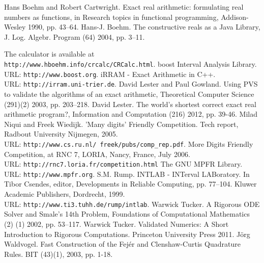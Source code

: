 \documentclass[9pt, a4, twocolumn]{article}
\begin{document}
\begin{thebibliography}{99}
 Hans Boehm and Robert Cartwright. Exact real
  arithmetic: formulating real numbers as functions, in Research
  topics in functional programming,
Addison-Wesley 1990, pp. 43--64.
 Hans-J. Boehm. The constructive reals as a Java
  Library, J. Log. Algebr. Program (64) 2004, pp. 3--11.

The calculator is available at \\ \texttt{http://www.hboehm.info/crcalc/CRCalc.html}.
 boost Interval Analysis Library.
\\ URL:
  \texttt{http://www.boost.org}.
 iRRAM - Exact Arithmetic in C++. \\ URL: \texttt{http://irram.uni-trier.de}.
 David Lester and Paul Gowland. Using PVS to
  validate the algorithms of an exact arithmetic, Theoretical Computer
  Science (291)(2) 2003, pp. 203--218.
 David Lester. The world's shortest correct exact real
  arithmetic program?, Information and Computation (216) 2012,
  pp. 39-46.
 Milad Niqui and Freek Wiedijk. 'Many digits' Friendly
  Competition. Tech report, Radbout University Nijmegen, 2005. \\ URL:
  \texttt{http://www.cs.ru.nl/~freek/pubs/comp\_rep.pdf}.
 More Digits Friendly Competition, at RNC 7, LORIA,
  Nancy, France, July 2006. \\URL: \texttt{http://rnc7.loria.fr/competition.html}
 The GNU MPFR Library. \\URL: \texttt{http://www.mpfr.org}.
 S.M. Rump. INTLAB - INTerval LABoratory. In Tibor Csendes, editor, 
Developments in Reliable Computing, pp. 77--104. Kluwer Academic
Publishers, Dordrecht, 1999. \\
URL: \texttt{http://www.ti3.tuhh.de/rump/intlab}.
 Warwick Tucker. A Rigorous ODE Solver and Smale's
  14th Problem, Foundations of Computational Mathematics (2) (1)
  2002, pp. 53--117.
Warwick Tucker. Validated Numerics:
A Short Introduction to Rigorous Computations.
Princeton University Press 2011.
 J\"org Waldvogel. Fast Construction of the Fej\'er and
  Clenshaw-Curtis Quadrature Rules. BIT (43)(1), 2003, pp. 1-18.
\end{thebibliography}
\end{document}
